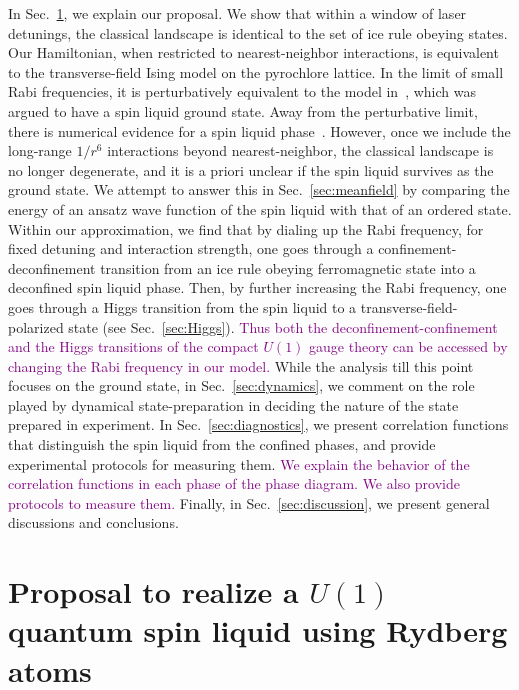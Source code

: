 \documentclass[twocolumn,superscriptaddress,amsmath,amssymb,aps,prx,nofootinbib]{revtex4-2}
\newcommand{\newtext}[1]{\textcolor{purple}{#1}}
\begin{document}
In Sec.~\ref{sec:proposal}, we explain our proposal. We show that within a window of laser detunings, the classical landscape is identical to the set of ice rule obeying states. Our Hamiltonian, when restricted to nearest-neighbor interactions, is equivalent to the transverse-field Ising model on the pyrochlore lattice. In the limit of small Rabi frequencies, it is perturbatively equivalent to the model in~\cite{hermele2004}, which was argued to have a spin liquid ground state. Away from the perturbative limit, there is numerical evidence for a spin liquid phase~\cite{emonts2018monte}. However, once we include the long-range $1/r^6$ interactions beyond nearest-neighbor, the classical landscape is no longer degenerate, and it is a priori unclear if the spin liquid survives as the ground state. We attempt to answer this in Sec.~\ref{sec:meanfield} by comparing the energy of an ansatz wave function of the spin liquid with that of an ordered state. 
Within our approximation, we find that by dialing up the Rabi frequency, for fixed detuning and interaction strength, one goes through a confinement-deconfinement transition from an ice rule obeying ferromagnetic state into a deconfined spin liquid phase. Then, by further increasing the Rabi frequency, one goes through a Higgs transition from the spin liquid to a transverse-field-polarized state (see Sec.~\ref{sec:Higgs}). 
\newtext{Thus both the deconfinement-confinement and the Higgs transitions of the compact $U(1)$ gauge theory can be accessed by changing the Rabi frequency in our model.}
While the analysis till this point focuses on the ground state, in Sec.~\ref{sec:dynamics}, we comment on the role played by dynamical state-preparation in deciding the nature of the state prepared in experiment. 
In Sec.~\ref{sec:diagnostics}, we present correlation functions that distinguish the spin liquid from the confined phases, and provide experimental protocols for measuring them.
\newtext{We explain the behavior of the correlation functions in each phase of the phase diagram. We also provide protocols to measure them.}
Finally, in Sec.~\ref{sec:discussion}, we present general discussions and conclusions.


\section{Proposal to realize a $U(1)$ quantum spin liquid using Rydberg atoms}\label{sec:proposal}
\end{document}

